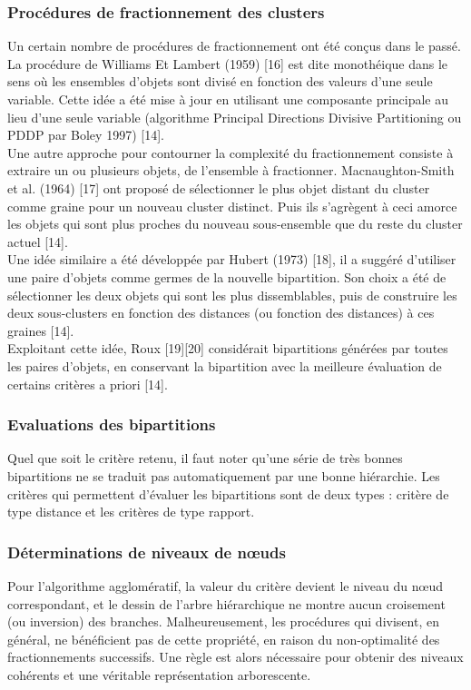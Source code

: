 \subsubsection{Procédures de fractionnement des clusters}
Un certain nombre de procédures de fractionnement ont été conçus dans le passé. La procédure de Williams Et Lambert (1959) [16] est dite monothéique dans le sens où les ensembles d'objets sont divisé en fonction des valeurs d'une seule variable. Cette idée a été mise à jour en utilisant une composante principale au lieu d'une seule variable (algorithme Principal Directions Divisive Partitioning ou PDDP par Boley 1997) [14]. \\
Une autre approche pour contourner la complexité du fractionnement consiste à extraire un ou plusieurs objets, de l'ensemble à fractionner. Macnaughton-Smith et al. (1964) [17] ont proposé de sélectionner le plus objet distant du cluster comme graine pour un nouveau cluster distinct. Puis ils s'agrègent à ceci amorce les objets qui sont plus proches du nouveau sous-ensemble que du reste du cluster actuel [14]. \\
Une idée similaire a été développée par Hubert (1973) [18], il a suggéré d'utiliser une paire d'objets comme germes de la nouvelle bipartition. Son choix a été de sélectionner les deux objets qui sont les plus dissemblables, puis de construire les deux sous-clusters en fonction des distances (ou fonction des distances) à ces graines [14]. \\
Exploitant cette idée, Roux [19][20] considérait bipartitions générées par toutes les paires d'objets, en conservant la bipartition avec la meilleure évaluation de certains critères a priori [14]. \\

\subsubsection{Evaluations des bipartitions}
Quel que soit le critère retenu, il faut noter qu’une série de très bonnes bipartitions ne se traduit pas automatiquement par une bonne hiérarchie.
Les critères qui permettent d’évaluer les bipartitions sont de deux types : critère de type distance et les critères de type rapport.

\subsubsection{Déterminations de niveaux de nœuds }
Pour l’algorithme agglomératif, la valeur du critère devient le niveau du nœud correspondant, et le dessin de l’arbre hiérarchique ne montre aucun croisement (ou inversion) des branches.
Malheureusement, les procédures qui divisent, en général, ne bénéficient pas de cette propriété, en raison du non-optimalité des fractionnements successifs. Une règle est alors nécessaire pour obtenir des niveaux cohérents et une véritable représentation arborescente.
